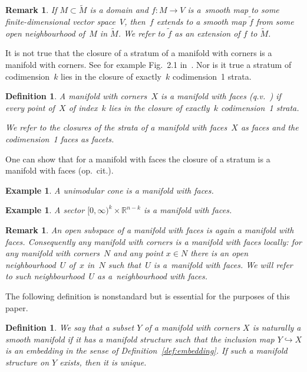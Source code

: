 \documentclass[pdftex]{sigma}
\numberwithin{equation}{section}
\newtheorem{Definition}[Lemma]{Definition}
\newtheorem{Example}[Lemma]{Example}
\newtheorem{Remark}[Lemma]{Remark}
\begin{document}
\begin{Remark} \label{rmrk:A9}
If $M\subset \tilde{M}$ is a domain and $f\colon M\to V$ is a~smooth map to some f\/inite-dimensional vector space~$V$, then~$f$
  extends to a smooth map $\tilde{f}$ from some open neighbourhood of~$M$ in $\tilde{M}$.
  We refer to
  $\tilde{f}$ as an {\em extension} of $f$ to $\tilde{M}$.
\end{Remark}

It is not true that the closure of a stratum of a manifold with corners
is a manifold with corners.  See for example Fig.~2.1 in~\cite{Joyce}.  Nor is it true a stratum
of codimension~$k$ lies in the closure of exactly~$k$ codimension~1
strata.


\begin{Definition} \label{def:faces} A manifold with corners~$X$ is a
{\em manifold with faces} (q.v.~\cite{Janich}) if every point of~$X$
of index~$k$ lies in the closure of exactly~$k$ codimension~1 strata.

We refer to the closures of the strata of a manifold with faces~$X$
as {\em faces} and
the codimension~1 faces as {\em facets.}
\end{Definition}

One can show that for a manifold with faces the
closure of a stratum is a manifold with faces (op.\ cit.).

\begin{Example} A unimodular cone is a manifold with faces.
\end{Example}

\begin{Example} A sector $[0,\infty)^k \times {\mathbb R}^{n-k}$ is a manifold
with faces.
\end{Example}

\begin{Remark}
  An open subspace of a manifold with faces is again a manifold with
  faces.  Consequently any manifold with corners is a manifold with
  faces locally: for any manifold with corners~$N$ and any point $x\in
  N$ there is an open neighbourhood~$U$ of~$x$ in~$N$ such that~$U$ is
  a~manifold with faces.  We will refer to such neighbourhood~$U$ as a~{\em neighbourhood with faces.}
\end{Remark}

The following def\/inition is nonstandard but is essential for the
purposes of this paper.

\begin{Definition} \label{submanifold}
  We say that a subset $Y$ of a manifold with corners $X$
  is \emph{naturally a smooth manifold}
  if it has a manifold structure such that the inclusion map
  $Y \hookrightarrow X$ is an embedding
  in the sense of Def\/inition~\ref{def:embedding}.
  If such a manifold structure on $Y$ exists, then it is unique.
\end{Definition}
\end{document}
